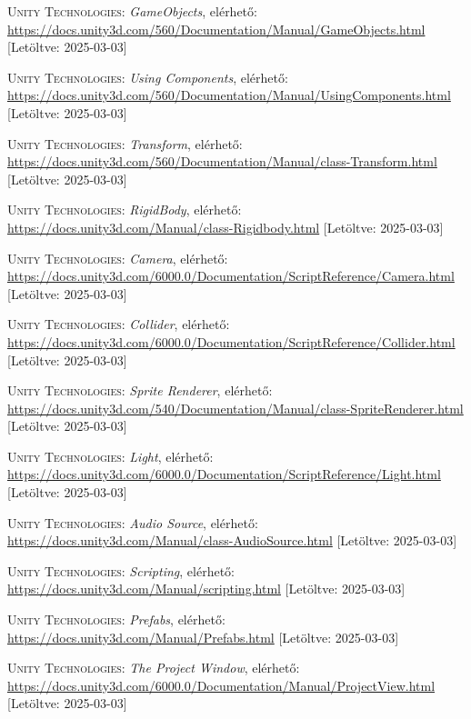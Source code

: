 \documentclass[]{thesis-ekf}
\theoremstyle{definition}
\theoremstyle{remark}
\begin{document}
\begin{thebibliography}{2}
	\textsc{Unity Technologies}: \emph{GameObjects}, elérhető:
	\url{https://docs.unity3d.com/560/Documentation/Manual/GameObjects.html} [Letöltve: 2025-03-03]
	
	\textsc{Unity Technologies}: \emph{Using Components}, elérhető:
	\url{https://docs.unity3d.com/560/Documentation/Manual/UsingComponents.html} [Letöltve: 2025-03-03]
	
	\textsc{Unity Technologies}: \emph{Transform}, elérhető:
	\url{https://docs.unity3d.com/560/Documentation/Manual/class-Transform.html} [Letöltve: 2025-03-03]
	
	\textsc{Unity Technologies}: \emph{RigidBody}, elérhető:
	\url{https://docs.unity3d.com/Manual/class-Rigidbody.html} [Letöltve: 2025-03-03]
	
	\textsc{Unity Technologies}: \emph{Camera}, elérhető:
	\url{https://docs.unity3d.com/6000.0/Documentation/ScriptReference/Camera.html} [Letöltve: 2025-03-03]
	
	\textsc{Unity Technologies}: \emph{Collider}, elérhető:
	\url{https://docs.unity3d.com/6000.0/Documentation/ScriptReference/Collider.html} [Letöltve: 2025-03-03]
	
	\textsc{Unity Technologies}: \emph{Sprite Renderer}, elérhető:
	\url{https://docs.unity3d.com/540/Documentation/Manual/class-SpriteRenderer.html} [Letöltve: 2025-03-03]
	
	\textsc{Unity Technologies}: \emph{Light}, elérhető:
	\url{https://docs.unity3d.com/6000.0/Documentation/ScriptReference/Light.html} [Letöltve: 2025-03-03]
	
	\textsc{Unity Technologies}: \emph{Audio Source}, elérhető:
	\url{https://docs.unity3d.com/Manual/class-AudioSource.html} [Letöltve: 2025-03-03]
	
	\textsc{Unity Technologies}: \emph{Scripting}, elérhető:
	\url{https://docs.unity3d.com/Manual/scripting.html} [Letöltve: 2025-03-03]
	
	\textsc{Unity Technologies}: \emph{Prefabs}, elérhető:
	\url{https://docs.unity3d.com/Manual/Prefabs.html} [Letöltve: 2025-03-03]
	
	\textsc{Unity Technologies}: \emph{The Project Window}, elérhető:
	\url{https://docs.unity3d.com/6000.0/Documentation/Manual/ProjectView.html} [Letöltve: 2025-03-03]
	

\end{thebibliography}
\end{document}
